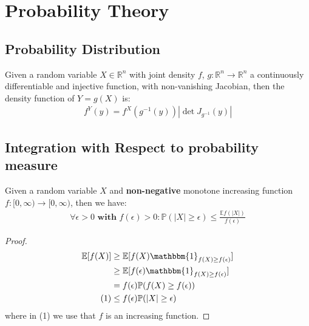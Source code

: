 \chapter{Probability Theory}
\section{Probability Distribution}
\begin{theorem}
Given a random variable $X \in \mathbb{R}^n$ with joint density $f$, $g: \mathbb{R}^n \rightarrow \mathbb{R}^n$ a continuously differentiable and injective function, with non-vanishing Jacobian, then the density function of $Y = g(X)$ is:
\begin{align*}
	f^Y(y) = f^X(g^{-1}(y)) |\det J_{g^{-1}}(y)|
\end{align*}
\end{theorem}

\begin{example}
\end{example}

\section{Integration with Respect to probability measure}
\begin{theorem}
Given a random variable $X$ and \textbf{non-negative} monotone increasing function $f:[0, \infty) \rightarrow [0, \infty)$, then we have:
\begin{align*}
	\forall \epsilon > 0 \textbf{ with } f(\epsilon) > 0: \mathbb{P}(|X| \geq \epsilon) \leq \frac{\mathbb{E}f(|X|)}{f(\epsilon)}
\end{align*}
\end{theorem}
\begin{proof}
	\begin{align*}
		\mathbb{E}[f(X)] &\geq \mathbb{E}[f(X) \mathbbm{1}_{f(X) \geq f(\epsilon)}]\\
		&\geq \mathbb{E}[f(\epsilon)\mathbbm{1}_{f(X) \geq f(\epsilon)}]\\
		&= f(\epsilon) \mathbb{P}(f(X) \geq f(\epsilon))\\
	(1)	&\leq f(\epsilon)\mathbb{P}(|X| \geq \epsilon)
	\end{align*}
	where in (1) we use that $f$ is an increasing function.
\end{proof}

